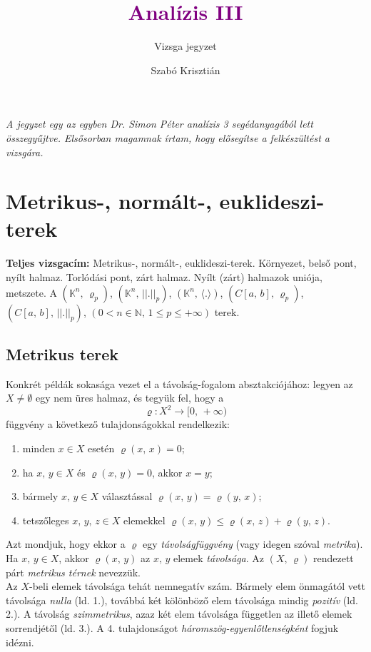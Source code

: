 \documentclass[12pt]{article}
\title{\textcolor{purple}{\Huge\textbf{Analízis III}}}
\author{Vizsga jegyzet}
\date{Szabó Krisztián}
\newcommand{\N}{\mathbb{N}}
\newcommand{\K}{\mathbb{K}}
\begin{document}
    \maketitle
    \textit{A jegyzet egy az egyben Dr. Simon Péter analízis 3 segédanyagából lett összegyűjtve. Elsősorban magamnak írtam, hogy elősegítse a felkészültést a vizsgára.}
    \tableofcontents
    \newpage

    \section{Metrikus-, normált-, euklideszi-terek}
    \textbf{Teljes vizsgacím:} Metrikus-, normált-, euklideszi-terek. Környezet, belső pont, nyílt halmaz. Torlódási pont, zárt halmaz. Nyílt (zárt) halmazok uniója, metszete. A $(\K^n, \, \varrho_p)$, $(\K^n, \, ||.||_p)$, $(\K^n, \, \langle . \rangle)$, $(C[a, \, b], \, \varrho_p)$, $(C[a, \, b], \, ||.||_p)$, $(0 < n \in \N, \, 1 \leq p \leq + \infty)$ terek.

    \subsection{Metrikus terek}
    Konkrét példák sokasága vezet el a távolság-fogalom absztakciójához: legyen az $X \neq \emptyset$ egy nem üres halmaz, és tegyük fel, hogy a
    \[
        \varrho : X^2 \to [0, \, + \infty)
    \]
    függvény a következő tulajdonságokkal rendelkezik:
    \begin{enumerate}
        \item minden $x \in X$ esetén $\varrho(x, \, x) = 0$;
        \item ha $x, \, y \in X$ és $\varrho(x, \, y) = 0$, akkor $x = y$;
        \item bármely $x, \, y \in X$ választással $\varrho(x, \, y) = \varrho(y, \, x)$;
        \item tetszőleges $x, \, y, \, z \in X$ elemekkel $\varrho(x, \, y) \leq \varrho(x, \, z) + \varrho(y, \, z)$.
    \end{enumerate}
    Azt mondjuk, hogy ekkor a $\varrho$ egy \textit{távolságfüggvény} (vagy idegen szóval \textit{metrika}). Ha $x, \, y \in X$, akkor $\varrho(x, \, y)$ az $x, \, y$ elemek \textit{távolsága}. Az $(X, \, \varrho)$ rendezett párt \textit{metrikus térnek} nevezzük.\\

    Az $X$-beli elemek távolsága tehát nemnegatív szám. Bármely elem önmagától vett távolsága \textit{nulla} (ld. 1.), továbbá két kölönböző elem távolsága mindig \textit{pozitív} (ld. 2.). A távolság \textit{szimmetrikus}, azaz két elem távolsága független az illető elemek sorrendjétől (ld. 3.). A 4. tulajdonságot \textit{háromszög-egyenlőtlenségként} fogjuk idézni.\\
\end{document}

